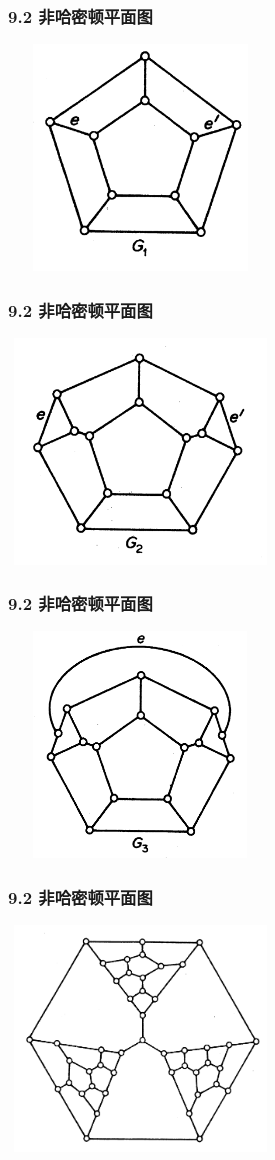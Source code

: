 \documentclass{beamer}
\begin{document}
\begin{CJK}{UTF8}{gbsn}
\begin{frame}
  \frametitle{9.2 非哈密顿平面图}
  \centering
  \includegraphics[width=7cm, height=6cm]{e1}
\end{frame}

\begin{frame}
  \frametitle{9.2 非哈密顿平面图}
  \centering
  \includegraphics[width=7cm, height=6cm]{e2}
\end{frame}

\begin{frame}
  \frametitle{9.2 非哈密顿平面图}
  \centering
  \includegraphics[width=7cm, height=6cm]{e3}
\end{frame}

\begin{frame}
  \frametitle{9.2 非哈密顿平面图}
  \centering
  \includegraphics[width=7cm, height=6cm]{e4}
\end{frame}




\end{CJK}
\end{document}
